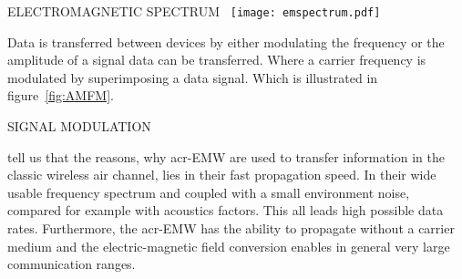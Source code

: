 \begin{RoyalFigure}[!htb, label=fig:emspectrum]{ELECTROMAGNETIC SPECTRUM~\cite{giancoli_physics_2015}}
    \texttt{[image: emspectrum.pdf]}
\end{RoyalFigure}

Data is transferred between devices by either modulating the frequency or the amplitude of a signal data can be 
transferred. Where a carrier frequency is modulated by superimposing a data signal. Which is illustrated in 
figure~\ref{fig:AMFM}.

\begin{RoyalFigure}[htb, label=fig:AMFM]{SIGNAL MODULATION}
    \begin{tcbraster}[raster columns=2, raster equal height]
    \end{tcbraster}
\end{RoyalFigure}

\citet{hagman_elias_design_2009} tell us that the reasons, why \gls{acr-EMW} are used to transfer information in the 
classic wireless air channel, lies in their fast propagation speed. In their wide usable frequency spectrum and 
coupled with a small environment noise, compared for example with acoustics factors. This all leads high possible 
data rates. Furthermore, the \gls{acr-EMW} has the ability to propagate without a carrier medium and the 
electric-magnetic field conversion enables in general very large communication ranges.

